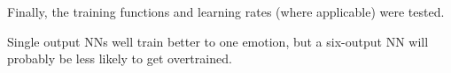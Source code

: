 \documentclass[a4paper]{article}
\begin{document}
Finally, the training functions and learning rates (where applicable) were tested.  
 









Single output NNs well train better to one emotion, but a six-output NN will probably be 
less likely to get overtrained.
\end{document}
